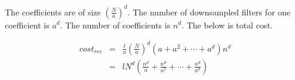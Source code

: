 \documentclass[a4paper,5pt]{article}
\begin{document}
The coefficients are of size $\left(\frac{N}{a}\right)^{d}$. The number of downsampled filters for one coefficient is $a^{d}$. The number of coefficients is $n^{d}$. The below is total cost.


\begin{eqnarray}
cost_{rec} &=& \frac{l}{a}\left(\frac{N}{a}\right)^{d}\left(a+a^{2}+\cdots+a^{d}\right)n^{d}    \\
&=& lN^{d}\left(\frac{n^{d}}{a}+\frac{n^{d}}{a^{2}}+\cdots+\frac{n^{d}}{a^{d}}\right)
\end{eqnarray}
\end{document}
